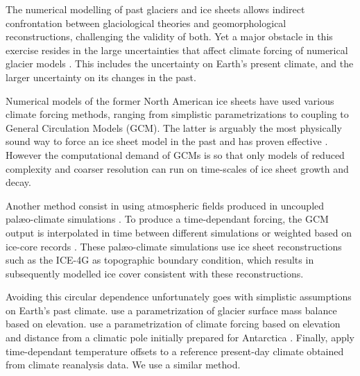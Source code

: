 
\introduction
\label{sec:intro}

The numerical modelling of past glaciers and ice sheets allows indirect confrontation between glaciological theories and geomorphological reconstructions, challenging the validity of both. Yet a major obstacle in this exercise resides in the large uncertainties that affect climate forcing of numerical glacier models \citep{hebeler-etal-2008}. This includes the uncertainty on Earth's present climate, and the larger uncertainty on its changes in the past.

Numerical models of the former North American ice sheets have used various climate forcing methods, ranging from simplistic parametrizations to coupling to General Circulation Models (GCM). The latter is arguably the most physically sound way to force an ice sheet model in the past and has proven effective \citep{yoshimori-etal-2001,calov-etal-2002,abeouchi-etal-2007,charbit-etal-2013}. However the computational demand of GCMs is so that only models of reduced complexity and coarser resolution can run on time-scales of ice sheet growth and decay.

Another method consist in using atmospheric fields produced in uncoupled palæo-climate simulations \citep{huybrechts-tsiobbel-1996}. To produce a time-dependant forcing, the GCM output is interpolated in time between different simulations \citep{charbit-etal-2002} or weighted based on ice-core records \citep{marshall-clarke-1999,tarasov-peltier-2004,zweck-huybrechts-2005,gregoire-etal-2012}. These palæo-climate simulations use ice sheet reconstructions such as the ICE-4G \citep{peltier-1994} as topographic boundary condition, which results in subsequently modelled ice cover consistent with these reconstructions.


Avoiding this circular dependence unfortunately goes with simplistic assumptions on Earth's past climate. \citet{robert-1991} use a parametrization of glacier surface mass balance based on elevation. \citet{fastook-prentice-1994} use a parametrization of climate forcing based on elevation and distance from a climatic pole initially prepared for Antarctica \citep{johnson-fastook-2002}. Finally, \citet{bintanja-etal-2005} apply time-dependant temperature offsets to a reference present-day climate obtained from climate reanalysis data. We use a similar method.

